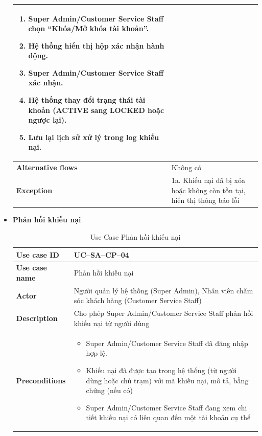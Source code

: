 \begin{itemize}
\begin{center}
\begin{longtable}{|m{}|m{}|}
\begin{enumerate}[label=\arabic*.]
        \item Super Admin/Customer Service Staff chọn “Khóa/Mở khóa tài khoản”.
        \item Hệ thống hiển thị hộp xác nhận hành động.
        \item Super Admin/Customer Service Staff xác nhận.
        \item Hệ thống thay đổi trạng thái tài khoản (ACTIVE sang LOCKED hoặc ngược lại).
        \item Lưu lại lịch sử xử lý trong log khiếu nại.
      \end{enumerate}\\
      \hline
      \textbf{Alternative flows} &
      Không có\\
      \hline
      \textbf{Exception} &
      1a. Khiếu nại đã bị xóa hoặc không còn tồn tại, hiển thị thông báo lỗi\\
      \hline
      \end{longtable}
  \end{center}
\item \textbf{Phản hồi khiếu nại}
  \begin{center}
    \renewcommand{\arraystretch}{1.5}
    \begin{longtable}{|m{}|m{}|}
          \caption{Use Case Phản hồi khiếu nại}
      \label{tab:uc_sa_cp_04} \\
      \hline
      \textbf{Use case ID} & UC--SA--CP--04 \\
      \hline
      \textbf{Use case name} & Phản hồi khiếu nại \\
      \hline
      \textbf{Actor} & Người quản lý hệ thống (Super Admin), Nhân viên chăm sóc khách hàng (Customer Service Staff) \\
      \hline
      \textbf{Description} & Cho phép Super Admin/Customer Service Staff phản hồi khiếu nại từ người dùng\\
      \hline
      \textbf{Preconditions} &
      \begin{itemize}
        \item Super Admin/Customer Service Staff đã đăng nhập hợp lệ.
        \item Khiếu nại đã được tạo trong hệ thống (từ người dùng hoặc chủ trạm) với mã khiếu nại, mô tả, bằng chứng (nếu có)
        \item Super Admin/Customer Service Staff đang xem chi tiết khiếu nại có liên quan đến một tài khoản cụ thể
      \end{itemize}\\

\end{longtable}
\end{center}
\end{itemize}
